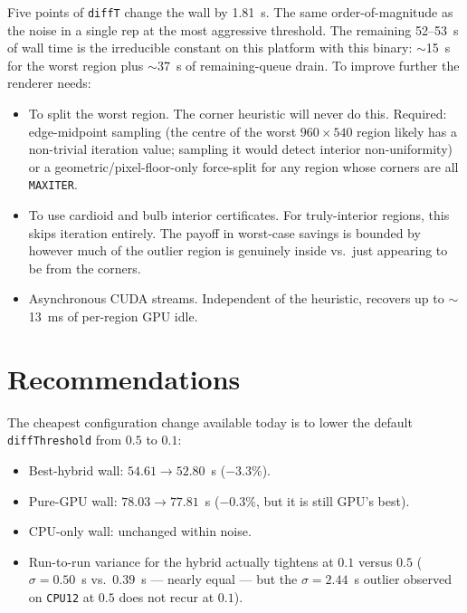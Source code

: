 \documentclass[
	english,
	letterpaper, oneside
]{article}
\begin{document}
Five points of \texttt{diffT} change the wall by 1.81~s. The same
order-of-magnitude as the noise in a single rep at the most aggressive
threshold. The remaining 52--53~s of wall time is the irreducible
constant on this platform with this binary: $\sim$15~s for the worst
region plus $\sim$37~s of remaining-queue drain. To improve further
the renderer needs:

\begin{itemize}
    \item To split the worst region. The corner heuristic
    will never do this. Required: edge-midpoint sampling (the centre
    of the worst $960 \times 540$ region likely has a non-trivial
    iteration value; sampling it would detect interior non-uniformity)
    or a geometric/pixel-floor-only force-split for any region whose
    corners are all \texttt{MAXITER}.
    \item To use cardioid and bulb interior certificates. For
    truly-interior regions, this skips iteration entirely. The
    payoff in worst-case savings is bounded by however much of the
    outlier region is genuinely inside vs.\ just appearing to be from
    the corners.
    \item Asynchronous CUDA streams. Independent of the
    heuristic, recovers up to $\sim$13~ms of per-region GPU idle.
\end{itemize}

\section{Recommendations}

The cheapest configuration change available today is to lower the
default \texttt{diffThreshold} from $0.5$ to $0.1$:

\begin{itemize}
    \item Best-hybrid wall: $54.61 \to 52.80$~s ($-3.3\%$).
    \item Pure-GPU wall: $78.03 \to 77.81$~s ($-0.3\%$, but it is
    still GPU's best).
    \item CPU-only wall: unchanged within noise.
    \item Run-to-run variance for the hybrid actually tightens
    at $0.1$ versus $0.5$ ($\sigma = 0.50$~s vs.\ $0.39$~s --- nearly
    equal --- but the $\sigma = 2.44$~s outlier observed on
    \texttt{CPU12} at $0.5$ does not recur at $0.1$).
\end{itemize}
\end{document}
